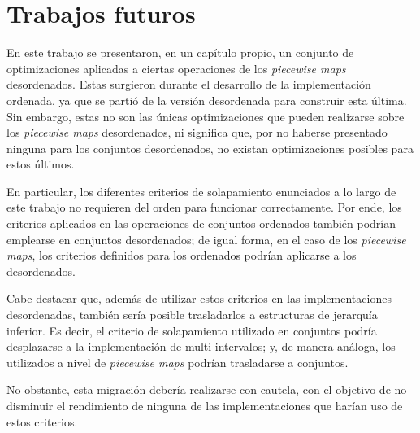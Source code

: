 \section*{Trabajos futuros}

En este trabajo se presentaron, en un capítulo propio, un conjunto de optimizaciones 
aplicadas a ciertas operaciones de los \textit{piecewise maps} desordenados.  
Estas surgieron durante el desarrollo de la implementación ordenada, 
ya que se partió de la versión desordenada para construir esta última.  
Sin embargo, estas no son las únicas optimizaciones que pueden realizarse sobre 
los \textit{piecewise maps} desordenados, 
ni significa que, por no haberse presentado ninguna para los conjuntos desordenados, no existan optimizaciones posibles para estos últimos.

En particular, los diferentes criterios de solapamiento enunciados a lo largo de este trabajo 
no requieren del orden para funcionar correctamente.  
Por ende, los criterios aplicados en las operaciones de conjuntos ordenados 
también podrían emplearse en conjuntos desordenados; 
de igual forma, en el caso de los \textit{piecewise maps}, 
los criterios definidos para los ordenados podrían aplicarse a los desordenados.

Cabe destacar que, además de utilizar estos criterios en las implementaciones desordenadas, 
también sería posible trasladarlos a estructuras de jerarquía inferior.  
Es decir, el criterio de solapamiento utilizado en conjuntos podría desplazarse 
a la implementación de multi-intervalos; 
y, de manera análoga, los utilizados a nivel de \textit{piecewise maps} 
podrían trasladarse a conjuntos.

No obstante, esta migración debería realizarse con cautela, 
con el objetivo de no disminuir el rendimiento de ninguna de las implementaciones que harían uso de estos criterios.
